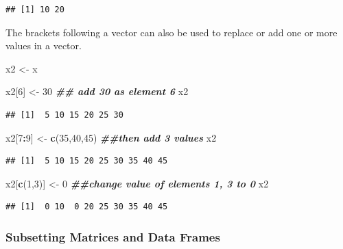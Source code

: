 \documentclass[
]{book}
\newenvironment{Shaded}{\begin{snugshade}}{\end{snugshade}}
\newcommand{\DecValTok}[1]{\textcolor[rgb]{0.00,0.00,0.81}{#1}}
\newcommand{\DocumentationTok}[1]{\textcolor[rgb]{0.56,0.35,0.01}{\textbf{\textit{#1}}}}
\newcommand{\FunctionTok}[1]{\textcolor[rgb]{0.13,0.29,0.53}{\textbf{#1}}}
\newcommand{\NormalTok}[1]{#1}
\newcommand{\OtherTok}[1]{\textcolor[rgb]{0.56,0.35,0.01}{#1}}
\newcommand{\SpecialCharTok}[1]{\textcolor[rgb]{0.81,0.36,0.00}{\textbf{#1}}}
\theoremstyle{definition}
\theoremstyle{definition}
\theoremstyle{definition}
\theoremstyle{definition}
\theoremstyle{remark}
\begin{document}
\begin{verbatim}
## [1] 10 20
\end{verbatim}

The brackets following a vector can also be used to replace or add one or more values in a vector.

\begin{Shaded}
\begin{Highlighting}[]
\NormalTok{x2 }\OtherTok{\textless{}{-}}\NormalTok{ x}

\NormalTok{x2[}\DecValTok{6}\NormalTok{] }\OtherTok{\textless{}{-}} \DecValTok{30} \DocumentationTok{\#\# add 30 as element 6}
\NormalTok{x2}
\end{Highlighting}
\end{Shaded}

\begin{verbatim}
## [1]  5 10 15 20 25 30
\end{verbatim}

\begin{Shaded}
\begin{Highlighting}[]
\NormalTok{x2[}\DecValTok{7}\SpecialCharTok{:}\DecValTok{9}\NormalTok{] }\OtherTok{\textless{}{-}} \FunctionTok{c}\NormalTok{(}\DecValTok{35}\NormalTok{,}\DecValTok{40}\NormalTok{,}\DecValTok{45}\NormalTok{) }\DocumentationTok{\#\#then add 3 values}
\NormalTok{x2}
\end{Highlighting}
\end{Shaded}

\begin{verbatim}
## [1]  5 10 15 20 25 30 35 40 45
\end{verbatim}

\begin{Shaded}
\begin{Highlighting}[]
\NormalTok{x2[}\FunctionTok{c}\NormalTok{(}\DecValTok{1}\NormalTok{,}\DecValTok{3}\NormalTok{)] }\OtherTok{\textless{}{-}} \DecValTok{0} \DocumentationTok{\#\#change value of elements 1, 3 to 0}
\NormalTok{x2}
\end{Highlighting}
\end{Shaded}

\begin{verbatim}
## [1]  0 10  0 20 25 30 35 40 45
\end{verbatim}

\hypertarget{subsetting-matrices-and-data-frames}{%
\subsubsection{Subsetting Matrices and Data Frames}\label{subsetting-matrices-and-data-frames}}
\end{document}
